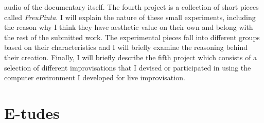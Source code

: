 audio of the documentary itself. The fourth project is a collection of short pieces called \emph{FreuPinta}. I will explain the nature of these small experiments, including the reason why I think they have aesthetic value on their own and belong with the rest of the submitted work. The experimental pieces fall into different groups based on their characteristics and I will briefly examine the reasoning behind their creation. Finally, I will briefly describe the fifth project which consists of a selection of different improvisations that I devised or participated in using the computer environment I developed for live improvisation.

\section{E-tudes}


